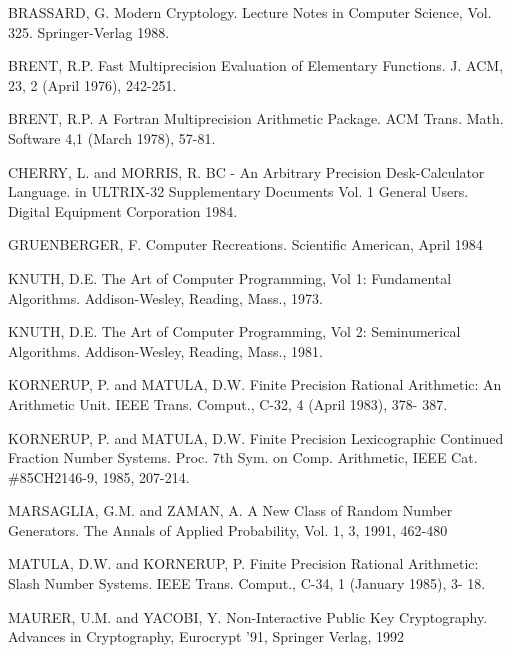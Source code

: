 \begin{thebibliography}{99}

      BRASSARD, G. Modern Cryptology. Lecture Notes  in  Computer  Science,
      Vol. 325. Springer-Verlag 1988.

      BRENT, R.P. Fast Multiprecision Evaluation of Elementary Functions.
      J. ACM, 23, 2 (April 1976), 242-251. 

      BRENT, R.P.  A Fortran Multiprecision Arithmetic Package. ACM Trans.  
      Math. Software 4,1 (March 1978), 57-81.  

      CHERRY, L. and MORRIS, R. BC - An Arbitrary Precision Desk-Calculator 
      Language. in ULTRIX-32 Supplementary Documents Vol.  1 General Users.  
      Digital Equipment Corporation 1984.  

      GRUENBERGER, F. Computer Recreations. Scientific American, April 1984  

      KNUTH,  D.E.  The  Art  of Computer Programming,  Vol 1:  Fundamental 
      Algorithms. Addison-Wesley, Reading, Mass., 1973.  

      KNUTH,  D.E.  The Art of Computer Programming,  Vol 2:  Seminumerical 
      Algorithms. Addison-Wesley, Reading, Mass., 1981.  

      KORNERUP, P.  and MATULA, D.W.  Finite Precision Rational Arithmetic: 
      An Arithmetic Unit.  IEEE Trans.  Comput., C-32, 4 (April 1983),  378-
      387.  
      
      KORNERUP,  P.   and  MATULA,  D.W.   Finite  Precision  Lexicographic 
      Continued  Fraction  Number  Systems.   Proc.   7th  Sym.   on  Comp. 
      Arithmetic, IEEE Cat.  \#85CH2146-9, 1985, 207-214.  

      MARSAGLIA, G.M. and ZAMAN, A. A New Class of Random Number Generators.
      The Annals of Applied Probability, Vol. 1, 3, 1991, 462-480

      MATULA, D.W.  and KORNERUP, P.  Finite Precision Rational Arithmetic: 
      Slash Number Systems. IEEE Trans.  Comput., C-34, 1 (January 1985), 3-
      18.  

      MAURER, U.M. and YACOBI, Y. Non-Interactive Public Key Cryptography.
      Advances in Cryptography, Eurocrypt '91, Springer Verlag, 1992


\end{thebibliography}
